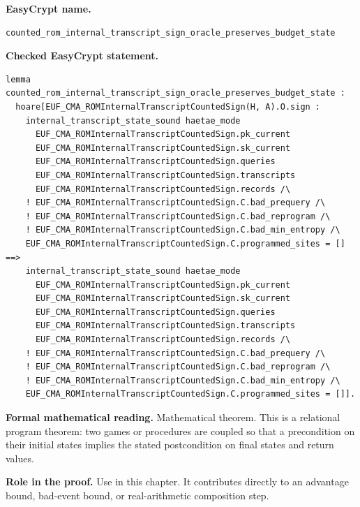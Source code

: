 \begin{formaltheorem}
\noindent\textbf{EasyCrypt name.}
\begin{lstlisting}[language=EasyCrypt,basicstyle=\ttfamily\scriptsize]
counted_rom_internal_transcript_sign_oracle_preserves_budget_state
\end{lstlisting}
\noindent\textbf{Checked EasyCrypt statement.}
\begin{lstlisting}[language=EasyCrypt,basicstyle=\ttfamily\scriptsize]
lemma counted_rom_internal_transcript_sign_oracle_preserves_budget_state :
  hoare[EUF_CMA_ROMInternalTranscriptCountedSign(H, A).O.sign :
    internal_transcript_state_sound haetae_mode
      EUF_CMA_ROMInternalTranscriptCountedSign.pk_current
      EUF_CMA_ROMInternalTranscriptCountedSign.sk_current
      EUF_CMA_ROMInternalTranscriptCountedSign.queries
      EUF_CMA_ROMInternalTranscriptCountedSign.transcripts
      EUF_CMA_ROMInternalTranscriptCountedSign.records /\
    ! EUF_CMA_ROMInternalTranscriptCountedSign.C.bad_prequery /\
    ! EUF_CMA_ROMInternalTranscriptCountedSign.C.bad_reprogram /\
    ! EUF_CMA_ROMInternalTranscriptCountedSign.C.bad_min_entropy /\
    EUF_CMA_ROMInternalTranscriptCountedSign.C.programmed_sites = [] ==>
    internal_transcript_state_sound haetae_mode
      EUF_CMA_ROMInternalTranscriptCountedSign.pk_current
      EUF_CMA_ROMInternalTranscriptCountedSign.sk_current
      EUF_CMA_ROMInternalTranscriptCountedSign.queries
      EUF_CMA_ROMInternalTranscriptCountedSign.transcripts
      EUF_CMA_ROMInternalTranscriptCountedSign.records /\
    ! EUF_CMA_ROMInternalTranscriptCountedSign.C.bad_prequery /\
    ! EUF_CMA_ROMInternalTranscriptCountedSign.C.bad_reprogram /\
    ! EUF_CMA_ROMInternalTranscriptCountedSign.C.bad_min_entropy /\
    EUF_CMA_ROMInternalTranscriptCountedSign.C.programmed_sites = []].
\end{lstlisting}
\noindent\textbf{Formal mathematical reading.}
Mathematical theorem. This is a relational program theorem: two games or procedures are coupled so that a precondition on their initial states implies the stated postcondition on final states and return values.

\noindent\textbf{Role in the proof.}
Use in this chapter. It contributes directly to an advantage bound, bad-event bound, or real-arithmetic composition step.


\end{formaltheorem}
